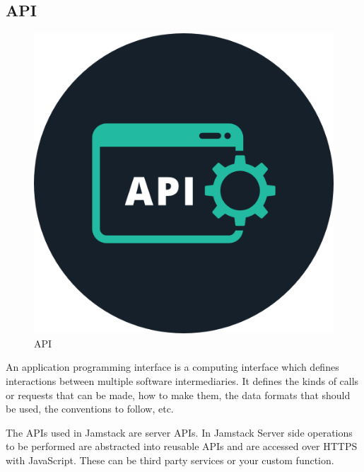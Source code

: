 \documentclass[12pt,a4paper,oneside]{report}
\begin{document}
\subsection{API}
\begin{figure}[H]
    \centering
    \includegraphics[scale=.2]{images/api.png}
    \caption{API\cite{api}}
\end{figure}
\par 
An application programming interface is a computing interface which defines interactions between multiple software intermediaries. It defines the kinds of calls or requests that can be made, how to make them, the data formats that should be used, the conventions to follow, etc.
\par 
The APIs used in Jamstack are server APIs. In Jamstack Server side operations to be performed are abstracted into reusable APIs and are accessed over HTTPS with JavaScript. These can be third party services or your custom function.
\end{document}
